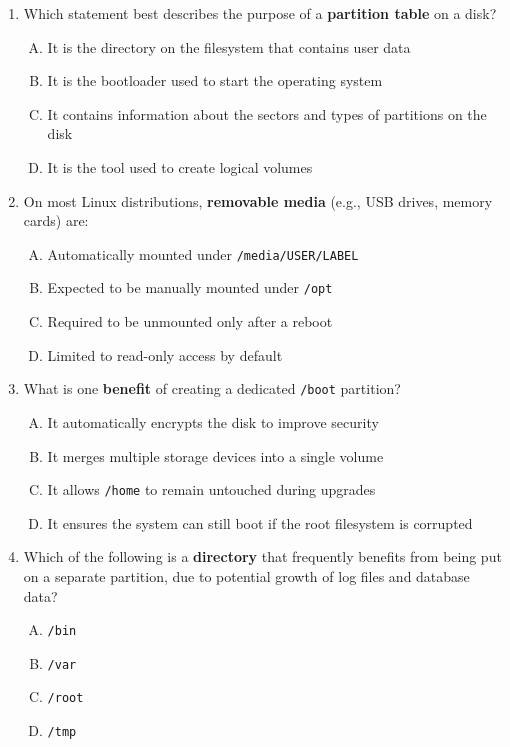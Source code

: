 \documentclass[a4paper]{report}
\begin{document}
\begin{enumerate}[1.]

    \item Which statement best describes the purpose of a \textbf{partition table} on a disk?  
    \begin{enumerate}[A)]
        \item It is the directory on the filesystem that contains user data  
        \item It is the bootloader used to start the operating system  
        \item It contains information about the sectors and types of partitions on the disk  
        \item It is the tool used to create logical volumes  
    \end{enumerate}

    \item On most Linux distributions, \textbf{removable media} (e.g., USB drives, memory cards) are:  
    \begin{enumerate}[A)]
        \item Automatically mounted under \texttt{/media/USER/LABEL}  
        \item Expected to be manually mounted under \texttt{/opt}  
        \item Required to be unmounted only after a reboot  
        \item Limited to read-only access by default  
    \end{enumerate}

    \item What is one \textbf{benefit} of creating a dedicated \texttt{/boot} partition?  
    \begin{enumerate}[A)]
        \item It automatically encrypts the disk to improve security  
        \item It merges multiple storage devices into a single volume  
        \item It allows \texttt{/home} to remain untouched during upgrades  
        \item It ensures the system can still boot if the root filesystem is corrupted  
    \end{enumerate}

    \item Which of the following is a \textbf{directory} that frequently benefits from being put on a separate partition, due to potential growth of log files and database data?  
    \begin{enumerate}[A)]
        \item \texttt{/bin}  
        \item \texttt{/var}  
        \item \texttt{/root}  
        \item \texttt{/tmp}  
    \end{enumerate}


\end{enumerate}
\end{document}
